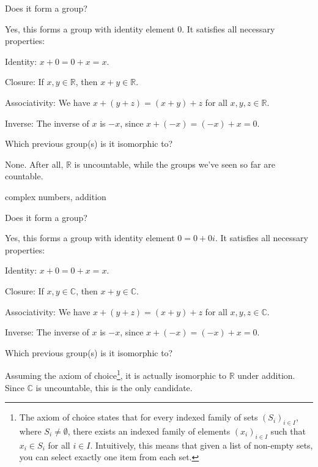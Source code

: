 \documentclass[../gatm_answers.tex]{subfiles}
\begin{document}
\begin{iinner_problem}[start=1]
\item Does it form a group?
\end{iinner_problem}

Yes, this forms a group with identity element $0$. It satisfies all necessary properties:

Identity: $x+0=0+x=x$.

Closure: If $x,y\in \mathbb{R}$, then $x+y\in \mathbb{R}$.

Associativity: We have $x+(y+z)=(x+y)+z$ for all $x,y,z \in \mathbb{R}$.

Inverse: The inverse of $x$ is $-x$, since $x+(-x)=(-x)+x=0$.

\begin{iinner_problem}
\item Which previous group(s) is it isomorphic to?
\end{iinner_problem}

None. After all, $\mathbb{R}$ is uncountable, while the groups we've seen so far are countable.

\begin{inner_problem}
\item complex numbers, addition
\end{inner_problem}

\begin{iinner_problem}[start=1]
\item Does it form a group?
\end{iinner_problem}

Yes, this forms a group with identity element $0=0+0i$. It satisfies all necessary properties:

Identity: $x+0=0+x=x$.

Closure: If $x,y\in \mathbb{C}$, then $x+y\in \mathbb{C}$.

Associativity: We have $x+(y+z)=(x+y)+z$ for all $x,y,z \in \mathbb{C}$.

Inverse: The inverse of $x$ is $-x$, since $x+(-x)=(-x)+x=0$.

\begin{iinner_problem}
\item Which previous group(s) is it isomorphic to?
\end{iinner_problem}

Assuming the axiom of choice\footnote{The axiom of choice states that for every indexed family of sets $(S_i)_{i\in I}$, where $S_i\neq \emptyset$, there exists an indexed family of elements $(x_i)_{i\in I}$  such that $x_i\in S_i$ for all $i\in I$. Intuitively, this means that given a list of non-empty sets, you can select exactly one item from each set.}, it is actually isomorphic to $\mathbb{R}$ under addition. Since $\mathbb{C}$ is uncountable, this is the only candidate.
\end{document}
